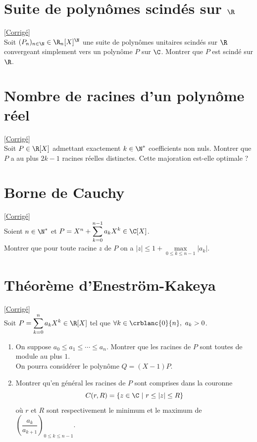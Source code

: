 \documentclass{book}
\begin{document}
	\section{Suite de polynômes scindés sur $\R$ }
	\textcolor{blue}{\hyperref[sec:suite-de-polynômes-scindés-sur-R]{[Corrigé]}}\\
	\label{Suite de polynômes scindés sur R}
	Soit $(P_n)_{n\in \N}\in \R_n[X]^\N$ une suite de polynômes unitaires scindés sur $\R$ convergeant simplement vers un polynôme $P$ sur $\C$. Montrer que $P$ est scindé sur $\R$.
	
	\section{Nombre de racines d'un polynôme réel }
	\textcolor{blue}{\hyperref[Nombre de racines d'un polynôme réel corrigé]{[Corrigé]}}\\
	\label{Nombre de racines d'un polynôme réel}
	Soit $P\in \R[X]$ admettant exactement $k\in \N^*$ coefficients non nuls. Montrer que $P$ a au plus $2k-1$ racines réelles distinctes. Cette majoration est-elle optimale ?
	
	\section{Borne de Cauchy }
	\textcolor{blue}{\hyperref[sec:borne-de-cauchy]{[Corrigé]}}\\
	\label{Borne de Cauchy}
	Soient $n\in \N^*$ et $P=X^n+\displaystyle\sum_{k=0}^{n-1}a_kX^k\in \C[X]$.\\
	Montrer que pour toute racine $z$ de $P$ on a $|z|\leq 1+\max\limits_{0\leq k\leq n-1}|a_k|$.
	
	\section{Théorème d'Eneström-Kakeya }
	\textcolor{blue}{\hyperref[sec:théorème-d'eneström-kakeya]{[Corrigé]}}\\
	\label{Théorème d'Eneström-Kakeya}
	Soit $P=\displaystyle\sum_{k=0}^na_kX^k\in \R[X]$ tel que $\forall k\in \crblanc{0}{n},\ a_k>0$.
	\begin{enumerate}
		\item On suppose $a_0\leq a_1\leq\cdots\leq a_n$. Montrer que les racines de $P$ sont toutes de module au plus $1$.\\
		On pourra considérer le polynôme $Q=(X-1)P$.
		\item Montrer qu'en général les racines de $P$ sont comprises dans la couronne
		$$C(r,R)=\{z\in \C\ |\ r\leq |z|\leq R\}$$
		où $r$ et $R$ sont respectivement le minimum et le maximum de $\left(\dfrac{a_k}{a_{k+1}}\right)_{0\leq k\leq n-1}$.
	\end{enumerate}
	
\end{document}
